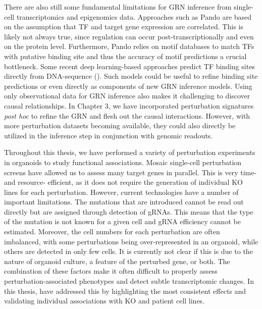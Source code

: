 There are also still some fundamental limitations for GRN inference from single-cell transcriptomics and epigenomics data. Approaches such as Pando are based on the assumption that TF and target gene expression are correlated. This is likely not always true, since regulation can occur post-transcriptionally and even on the protein level. Furthermore, Pando relies on motif databases to match TFs with putative binding site and thus the accuracy of motif predictions a crucial bottleneck. Some recent deep learning-based approaches predict TF binding sites directly from DNA-sequence (\cite{avsec_effective_2021,janssens_decoding_2022}). Such models could be useful to refine binding site predictions or even directly as components of new GRN inference models. Using only observational data for GRN inference also makes it challenging to discover causal relationships. In Chapter 3, we have incorporated perturbation signatures \textit{post hoc} to refine the GRN and flesh out the causal interactions. However, with more perturbation datasets becoming available, they could also directly be utilized in the inference step in conjunction with genomic readouts. 

Throughout this thesis, we have performed a variety of perturbation experiments in organoids to study functional associations. Mosaic single-cell perturbation screens have allowed us to assess many target genes in parallel. This is very time- and resource- efficient, as it does not require the generation of individual KO lines for each perturbation. However, current technologies have a number of important limitations. The mutations that are introduced cannot be read out directly but are assigned through detection of gRNAs. This means that the type of the mutation is not known for a given cell and gRNA efficiency cannot be estimated. Moreover, the cell numbers for each perturbation are often imbalanced, with some perturbations being over-represented in an organoid, while others are detected in only few cells. It is currently not clear if this is due to the nature of organoid culture, a feature of the perturbed gene, or both. The combination of these factors make it often difficult to properly assess perturbation-associated phenotypes and detect subtle transcriptomic changes. In this thesis, have addressed this by highlighting the most consistent effects and validating individual associations with KO and patient cell lines. 





